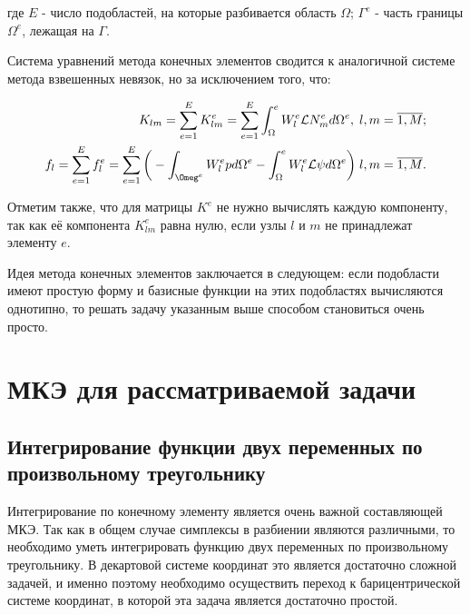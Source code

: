 \documentclass[14pt]{extreport}
\begin{document}
\noindent где $E$ - число подобластей, на которые разбивается область $\Omega$; $\Gamma^e$ - часть границы $\Omega^e$, лежащая на $\Gamma$.

Система уравнений метода конечных элементов сводится к аналогичной системе метода взвешенных невязок, но за исключением того, что:

\begin{eqnarray}
K_{lm}=\sum\limits_{e=1}^{E} K_{lm}^{e}=\sum\limits_{e=1}^{E}\int_\Omega^{e} W_l^{e} \mathcal L N_{m}^{e}  d\Omega^{e}, \; l, m=\overline{1,M}; \\
f_l=\sum\limits_{e=1}^{E} f_{l}^{e}=\sum\limits_{e=1}^{E} \bigg(-\int_{\Omeg^{e}} W_{l}^{e} p d \Omega^{e} -\int_\Omega^{e} W_{l}^{e} \mathcal L \psi d \Omega^{e}\bigg) \; l, m=\overline{1,M}. 
\end{eqnarray}

Отметим также, что для матрицы $K^{e}$ не нужно вычислять каждую компоненту, так как её компонента $K_{lm}^{e}$ равна нулю, если узлы $l$ и $m$ не принадлежат элементу $e$. 

Идея метода конечных элементов заключается в следующем: если подобласти имеют простую форму и базисные функции на этих подобластях вычисляются однотипно, то решать задачу указанным выше способом становиться очень просто. 


\section{МКЭ для рассматриваемой задачи}


\subsection{Интегрирование функции двух переменных по произвольному треугольнику}

Интегрирование по конечному элементу является очень важной составляющей МКЭ. Так как в общем случае симплексы в разбиении являются различными, то необходимо уметь интегрировать функцию двух переменных по произвольному треугольнику. В декартовой системе координат это является достаточно сложной задачей, и именно поэтому необходимо осуществить переход к барицентрической системе координат, в которой эта задача является достаточно простой.
\end{document}
